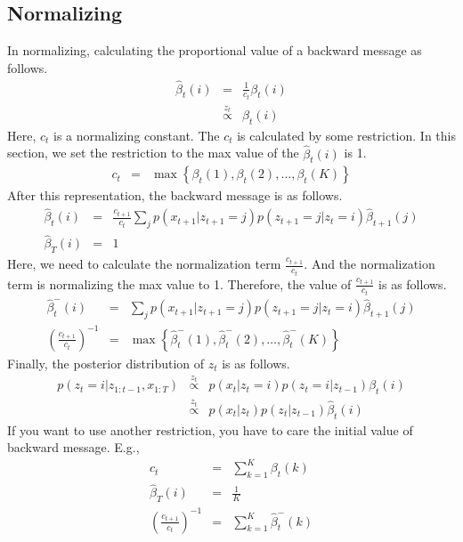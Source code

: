 \documentclass[a4paper]{article}
\newcommand{\proptoas}[1]{\overset{#1}{\propto}}
\begin{document}
\subsection{Normalizing}
In normalizing, calculating the proportional value of a backward message as follows.
\begin{eqnarray}
	\hat{\beta}_t(i) &=& \frac{1}{c_t} \beta_t(i) \\
	&\proptoas{z_t}& \beta_t(i)
\end{eqnarray}
Here, $c_t$ is a normalizing constant.
The $c_t$ is calculated by some restriction.
In this section, we set the restriction to the max value of the $\hat{\beta}_t(i)$ is 1.
\begin{eqnarray}
	c_t &=& \max{\left\{ \beta_t(1), \beta_t(2), \ldots, \beta_t(K)\right\}}
\end{eqnarray}
After this representation, the backward message is as follows.
\begin{eqnarray}
	\hat{\beta}_t(i) &=& \frac{c_{t+1}}{c_t} \sum_{j}{p(x_{t+1} | z_{t+1} = j) p(z_{t+1} = j | z_{t} = i) \hat{\beta}_{t+1}(j)} \\
	\hat{\beta}_T(i) &=& 1
\end{eqnarray}
Here, we need to calculate the normalization term $\frac{c_{t+1}}{c_t}$.
And the normalization term is normalizing the max value to 1.
Therefore, the value of $\frac{c_{t+1}}{c_t}$ is as follows.
\begin{eqnarray}
	\hat{\beta}_{t}^{-}(i)
	&=&
	\sum_{j}{p(x_{t+1} | z_{t+1} = j) p(z_{t+1} = j | z_{t} = i) \hat{\beta}_{t+1}(j)} \\
	\left(\frac{c_{t+1}}{c_t}\right)^{-1}
	&=&
	\max{\left\{ \hat{\beta}_{t}^{-}(1), \hat{\beta}_{t}^{-}(2), \ldots, \hat{\beta}_{t}^{-}(K)\right\}}
\end{eqnarray}
Finally, the posterior distribution of $z_t$ is as follows.
\begin{eqnarray}
	p(z_{t} = i | z_{1:t-1}, x_{1:T})
	&\proptoas{z_t}&
	p(x_t | z_t = i) p(z_t = i | z_{t-1}) \beta_t(i) \\
	&\proptoas{z_t}&
	p(x_t | z_t) p(z_t | z_{t-1}) \hat{\beta}_t(i)
\end{eqnarray}
If you want to use another restriction, you have to care the initial value of backward message.
E.g.,
\begin{eqnarray}
	c_t &=& \sum_{k=1}^{K}{\beta_t(k)} \\
	\hat{\beta}_T(i) &=& \frac{1}{K}\\
	\left(\frac{c_{t+1}}{c_t}\right)^{-1} &=& \sum_{k=1}^{K}{\hat{\beta}_{t}^{-}(k)}
\end{eqnarray}
\end{document}
